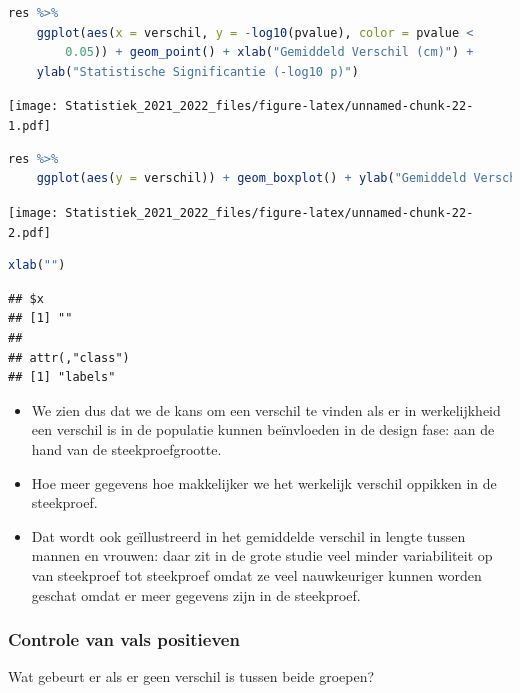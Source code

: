 \documentclass[
  12pt,dutch,coursenotes]{book}
\theoremstyle{definition}
\theoremstyle{definition}
\theoremstyle{definition}
\theoremstyle{definition}
\theoremstyle{remark}
\begin{document}
\begin{lstlisting}[language=R]
res %>%
    ggplot(aes(x = verschil, y = -log10(pvalue), color = pvalue <
        0.05)) + geom_point() + xlab("Gemiddeld Verschil (cm)") +
    ylab("Statistische Significantie (-log10 p)")
\end{lstlisting}

\texttt{[image: Statistiek\_2021\_2022\_files/figure-latex/unnamed-chunk-22-1.pdf]}

\begin{lstlisting}[language=R]
res %>%
    ggplot(aes(y = verschil)) + geom_boxplot() + ylab("Gemiddeld Verschil (cm)")
\end{lstlisting}

\texttt{[image: Statistiek\_2021\_2022\_files/figure-latex/unnamed-chunk-22-2.pdf]}

\begin{lstlisting}[language=R]
xlab("")
\end{lstlisting}

\begin{lstlisting}
## $x
## [1] ""
## 
## attr(,"class")
## [1] "labels"
\end{lstlisting}

\begin{itemize}
\item
  We zien dus dat we de kans om een verschil te vinden als er in werkelijkheid een verschil is in de populatie kunnen beïnvloeden in de design fase: aan de hand van de steekproefgrootte.
\item
  Hoe meer gegevens hoe makkelijker we het werkelijk verschil oppikken in de steekproef.
\item
  Dat wordt ook geïllustreerd in het gemiddelde verschil in lengte tussen mannen en vrouwen: daar zit in de grote studie veel minder variabiliteit op van steekproef tot steekproef omdat ze veel nauwkeuriger kunnen worden geschat omdat er meer gegevens zijn in de steekproef.
\end{itemize}

\hypertarget{controle-van-vals-positieven}{%
\subsubsection{Controle van vals positieven}\label{controle-van-vals-positieven}}

Wat gebeurt er als er geen verschil is tussen beide groepen?
\end{document}
